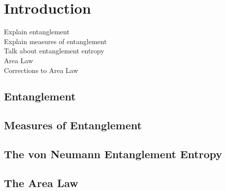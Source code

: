 \chapter{Introduction}



Explain entanglement\\
Explain measures of entanglement\\
Talk about entanglement entropy\\
Area Law\\
Corrections to Area Law\\

\section{Entanglement}
\section{Measures of Entanglement}
\section{The von Neumann Entanglement Entropy}
\section{The Area Law}

